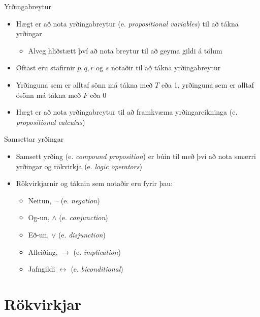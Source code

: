 \documentclass{beamer}
\begin{document}
\begin{frame}{Yrðingabreytur}
\begin{itemize}
 \item Hægt er að nota yrðingabreytur (e. \emph{propositional variables}) til að tákna yrðingar
 \begin{itemize}
  \item Alveg hliðstætt því að nota breytur til að geyma gildi á tölum
 \end{itemize}
 \item Oftast eru stafirnir $p, q, r$ og $s$ notaðir til að tákna yrðingabreytur
 \item Yrðinguna sem er alltaf sönn má tákna með $T$ eða 1, yrðinguna sem er alltaf ósönn má tákna með $F$ eða 0
 \item Hægt er að nota yrðingabreytur til að framkvæma yrðingareikninga (e. \emph{propositional calculus})
\end{itemize}
\end{frame}

\begin{frame}{Samsettar yrðingar}
\begin{itemize}
 \item Samsett yrðing (e. \emph{compound proposition}) er búin til með því að nota smærri yrðingar og rökvirkja (e. \emph{logic operators})
 \item Rökvirkjarnir og táknin sem notaðir eru fyrir þau:
 \begin{itemize}
  \item Neitun, $\lnot$ (e. \emph{negation})
  \item Og-un, $\land$ (e. \emph{conjunction})
  \item Eð-un, $\lor$ (e. \emph{disjunction})
  \item Afleiðing, $\to$ (e. \emph{implication})
  \item Jafngildi $\leftrightarrow$ (e. \emph{biconditional})
 \end{itemize}
\end{itemize}
\end{frame}

\section{Rökvirkjar}
\end{document}
